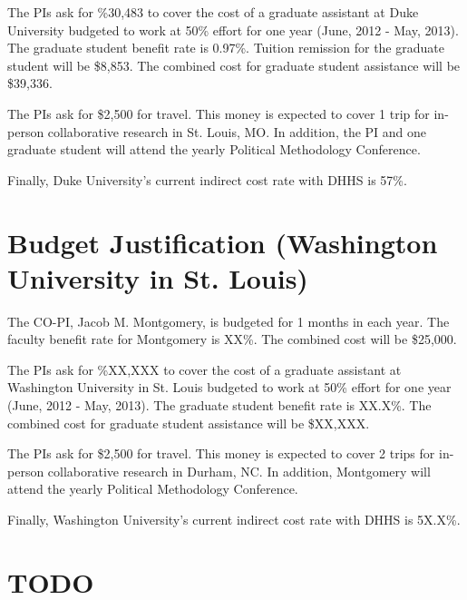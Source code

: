 \documentclass[pdftex,12pt,fullpage,oneside]{amsart}
\begin{document}
The PIs ask for \%30,483 to cover the cost of a graduate assistant at
Duke University budgeted to work at 50\% effort for one year (June,
2012 - May, 2013).  The graduate student benefit rate is 0.97\%.  Tuition remission
for the graduate student will be \$8,853. The
combined cost for graduate student assistance will be \$39,336.

The PIs ask for \$2,500 for travel.  This money is expected to cover 1
trip for in-person collaborative research in St. Louis, MO.  In addition,
the PI and one graduate student will attend the yearly Political
Methodology Conference.

Finally, Duke University's current indirect cost rate with DHHS is 57\%.


\newpage
\setcounter{page}{1}
\thispagestyle{empty}

\section*{Budget Justification (Washington University in St. Louis)}

The CO-PI, Jacob M. Montgomery, is budgeted for 1 months in each year.  The
faculty benefit rate for Montgomery is XX\%.   The combined cost will
be \$25,000.

The PIs ask for \%XX,XXX to cover the cost of a graduate assistant at
Washington University in St. Louis budgeted to work at 50\% effort for one year
(June, 2012 - May, 2013).  The graduate student benefit rate is
XX.X\%.  The combined cost for graduate student assistance will be
\$XX,XXX.

The PIs ask for \$2,500 for travel.  This money is expected to cover 2
trips for in-person collaborative research in Durham, NC.  In
addition, Montgomery will attend the yearly Political Methodology
Conference.

Finally, Washington University's current indirect cost rate with DHHS is 5X.X\%.

\newpage
\setcounter{page}{1}
\section*{TODO}
\end{document}
